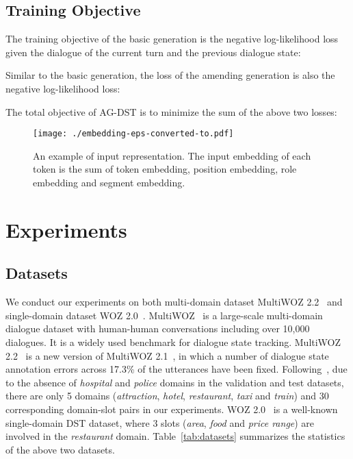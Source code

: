 \documentclass[11pt]{article}
\begin{document}
\subsection{Training Objective}

The training objective of the basic generation is the negative log-likelihood loss given the dialogue of the current turn and the previous dialogue state:

Similar to the basic generation, the loss of the amending generation is also the negative log-likelihood loss:


The total objective of AG-DST is to minimize the sum of the above two losses:


\begin{figure*}
	\centering
	\texttt{[image: ./embedding-eps-converted-to.pdf]}
	\caption{An example of input representation. The input embedding of each token is the sum of token embedding, position embedding, role embedding and segment embedding.}
	\label{fig:embedding}
\end{figure*}

\section{Experiments}

\subsection{Datasets}

We conduct our experiments on both multi-domain dataset MultiWOZ 2.2~\citep{zang-etal-2020-multiwoz} and single-domain dataset WOZ 2.0~\citep{wen-etal-2017-network}. MultiWOZ~\citep{budzianowski-etal-2018-multiwoz} is a large-scale multi-domain dialogue dataset with human-human conversations including over 10,000 dialogues. It is a widely used benchmark for dialogue state tracking. MultiWOZ 2.2~\citep{zang-etal-2020-multiwoz} is a new version of MultiWOZ 2.1~\citep{eric2019multiwoz}, in which a number of dialogue state annotation errors across 17.3\% of the utterances have been fixed. 
Following~\citet{wu-etal-2019-transferable}, due to the absence of \textit{hospital} and \textit{police} domains in the validation and test datasets, there are only 5 domains (\textit{attraction}, \textit{hotel}, \textit{restaurant}, \textit{taxi} and \textit{train}) and 30 corresponding domain-slot pairs in our experiments. WOZ 2.0~\citep{wen-etal-2017-network} is a well-known single-domain DST dataset, where 3 slots (\textit{area}, \textit{food} and \textit{price range}) are involved in the \textit{restaurant} domain. Table~\ref{tab:datasets} summarizes the statistics of the above two datasets.
\end{document}
